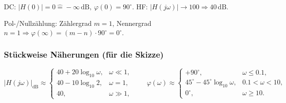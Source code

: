 \begin{description}[leftmargin=1.2em,labelsep=.6em,font=\bfseries]
\item[9. Grenzwerte und Konsistenz prüfen.]
DC: $|H(0)|=0\mathrel{\widehat{=}} -\infty\, \mathrm{dB},\ \varphi(0)=90^\circ$.
HF: $|H(j\omega)|\to 100\Rightarrow 40\,\mathrm{dB}$.

Pol-/Nullzählung: Zählergrad $m=1$, Nennergrad $n=1\Rightarrow \varphi(\infty)=(m-n)\cdot90^\circ=0^\circ$.
\end{description}

\subsubsection*{Stückweise Näherungen (für die Skizze)}
\[
|H(j\omega)|_{\mathrm{dB}}\approx
\begin{cases}
40+20\log_{10}\omega,& \omega\ll 1,\\[2pt]
40-10\log_{10}2,& \omega=1,\\[2pt]
40,& \omega\gg 1,
\end{cases}
\qquad
\varphi(\omega)\approx
\begin{cases}
+90^\circ,& \omega\le 0.1,\\[2pt]
45^\circ-45^\circ\log_{10}\omega,& 0.1<\omega<10,\\[2pt]
0^\circ,& \omega\ge 10.
\end{cases}
\]

\newpage
